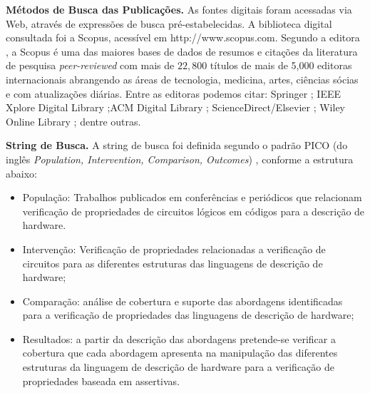 \textbf{Métodos de Busca das Publicações.} As fontes digitais foram acessadas via Web, através de expressões de busca pré-estabelecidas. A biblioteca digital consultada foi a Scopus, acessível em http://www.scopus.com. Segundo a editora \cite{Elsevier}, a Scopus é uma das maiores bases de dados de resumos e citações da literatura de pesquisa \textit{peer-reviewed} com mais de $22,800$ títulos de mais de 5,000 editoras internacionais abrangendo as áreas de tecnologia, medicina, artes, ciências sócias e com atualizações diárias. Entre as editoras podemos citar: Springer \cite{Springer}; IEEE Xplore Digital Library \cite{IEEE};ACM Digital Library \cite{ACM} ; ScienceDirect/Elsevier \cite{B.V}; Wiley Online Library \cite{Sons}; dentre outras.

\textbf{String de Busca.} A string de busca foi definida segundo o padrão PICO (do inglês \textit{Population, Intervention, Comparison, Outcomes}) \cite{kitchenham2009systematic}, conforme a estrutura abaixo:
\begin{itemize}
	\item População: Trabalhos publicados em conferências e periódicos que relacionam verificação de propriedades de circuitos lógicos em códigos para a descrição de hardware.

	\item Intervenção: Verificação de propriedades relacionadas a verificação de circuitos para as diferentes estruturas das linguagens de descrição de hardware;

	\item Comparação: análise de cobertura e suporte das abordagens identificadas para a verificação de propriedades das linguagens de descrição de hardware;

	\item Resultados: a partir da descrição das abordagens pretende-se verificar a cobertura que cada abordagem apresenta na manipulação das diferentes estruturas da linguagem de descrição de hardware para a verificação de propriedades baseada em assertivas.
\end{itemize}

